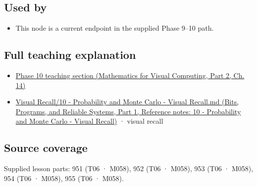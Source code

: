 \subsection{Used by}\label{appendix-33237f0f618b-used-by}

\hypertarget{appendix-33237f0f618b-used-by}{}

\begin{itemize}
\tightlist
\item
  This node is a current endpoint in the supplied Phase 9--10 path.
\end{itemize}

\subsection{Full teaching explanation}\label{appendix-33237f0f618b-full-teaching-explanation}

\hypertarget{appendix-33237f0f618b-full-teaching-explanation}{}

\begin{itemize}
\tightlist
\item
  \href{../02-Mathematics-for-Visual-Computing-P02/main.pdf\#02-foundations-ii-ch030-finite-samples-need-stable-descriptive-statistics}{Phase 10 teaching section (Mathematics for Visual Computing, Part 2, Ch. 14)}
\item
  \href{../01-Bits-Programs-and-Reliable-Systems-P01/main.pdf\#appendix-cb5af353ef77}{Visual Recall/10 - Probability and Monte Carlo - Visual Recall.md (Bits, Programs, and Reliable Systems, Part 1, Reference notes: 10 - Probability and Monte Carlo - Visual Recall)} · visual recall
\end{itemize}

\subsection{Source coverage}\label{appendix-33237f0f618b-source-coverage}

\hypertarget{appendix-33237f0f618b-source-coverage}{}

Supplied lesson parts: 951 (T06 · M058), 952 (T06 · M058), 953 (T06 · M058), 954 (T06 · M058), 955 (T06 · M058).
